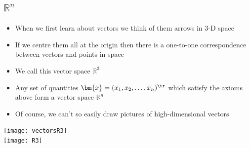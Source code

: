
\begin{slide}
\section[-1]{$\mathbb{R}^n$}

\begin{PauseHighLight}
  \begin{minipage}{0.8\linewidth}
    \begin{itemize}
    \item When we first learn about vectors we think of them arrows in 3-D
      space\pause
    \item If we centre them all at the origin then there is a one-to-one
      correspondence between vectors and points in space\pause
    \item We call this vector space $\mathbb{R}^3$\pause
    \item Any set of quantities $\bm{x} = (x_1, x_2, \ldots,
      x_n)^\tr$ which satisfy the axioms above form a vector space
      $\mathbb{R}^n$\pause
    \item Of course, we can't so easily draw pictures of
      high-dimensional vectors\pause
    \end{itemize}
  \end{minipage}
  \begin{minipage}{0.18\linewidth}
    \begin{center}
      \texttt{[image: vectorsR3]}\\
      \texttt{[image: R3]}
    \end{center}
  \end{minipage}
\end{PauseHighLight}


\end{slide}




